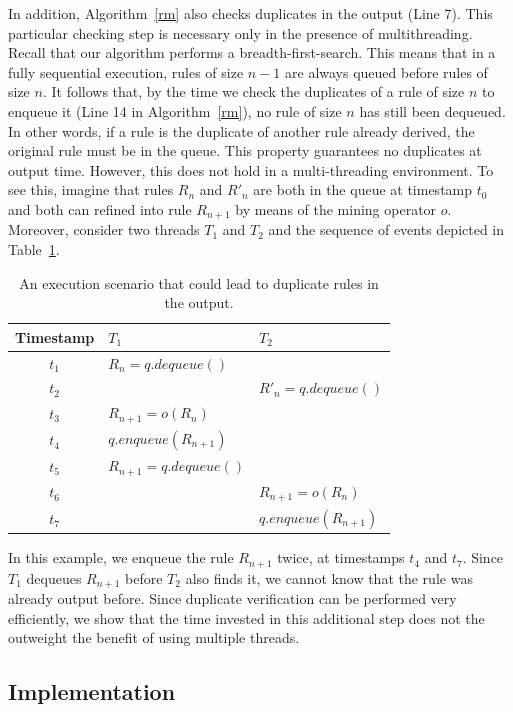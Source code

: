 In addition, Algorithm~\ref{rm} also checks duplicates in the output (Line 7). This particular checking step 
is necessary only in the presence of multithreading. Recall that our algorithm performs a breadth-first-search. 
This means that in a fully sequential execution, rules of size $n-1$ are always queued before rules of size $n$. 
It follows that, by the time we check the duplicates of a rule of size $n$ to enqueue it (Line 14 in Algorithm~\ref{rm}), 
no rule of size $n$ has still been dequeued. In other words, if a rule is the duplicate 
of another rule already derived, the original rule must be in the queue. This property guarantees no duplicates at output time. 
However, this does not hold in a multi-threading environment. To see this, imagine that rules 
$R_n$ and $R'_n$ are both in the queue at timestamp $t_0$ and both can refined into rule $R_{n+1}$
by means of the mining operator $o$. 
Moreover, consider two threads $T_1$ and $T_2$ and the sequence of events depicted in Table~\ref{tab:duplicates}.

\begin{table}
\centering
 \begin{tabular}{c|l|l}
  Timestamp & $T_1$ & $T_2$\\  \hline
  $t_1$ & $R_n = q.dequeue()$	&  \\
  $t_2$ & & $R'_n = q.dequeue()$ \\
  $t_3$ & $R_{n+1} = o(R_n)$  & \\
  $t_4$ & $q.enqueue(R_{n+1})$  & \\
  $t_5$ & $R_{n+1} = q.dequeue()$ & \\
  $t_6$ & & $R_{n+1} = o(R_n)$ \\
  $t_7$ & & $q.enqueue(R_{n+1})$ \\
\end{tabular}
\caption{An execution scenario that could lead to duplicate rules in the output.}\label{tab:duplicates}
\end{table}

In this example, we enqueue the rule $R_{n+1}$ twice, at timestamps $t_4$ and $t_7$. 
Since $T_1$ dequeues $R_{n+1}$ before $T_2$ also finds it, 
we cannot know that the rule was already output before. Since duplicate verification
can be performed very efficiently, we show that the time invested in this additional step does not the 
outweight the benefit of using multiple threads.


\subsection{Implementation} \label{subsec:implementation}

